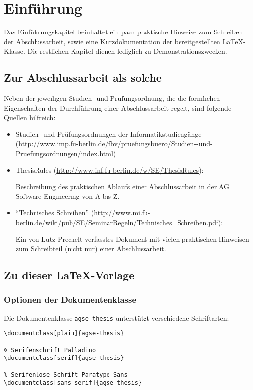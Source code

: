 \section{Einführung}

Das Einführungskapitel beinhaltet ein paar praktische Hinweise zum Schreiben
der Abschlussarbeit, sowie eine Kurzdokumentation der bereitgestellten
\LaTeX-Klasse.
Die restlichen Kapitel dienen lediglich zu Demonstrationszwecken.

\subsection{Zur Abschlussarbeit als solche}

Neben der jeweiligen Studien- und Prüfungsordnung, die die förmlichen
Eigenschaften der Durchführung einer Abschlussarbeit regelt, sind folgende
Quellen hilfreich:
\begin{itemize}
    \item Studien- und Prüfungsordnungen der Informatikstudiengänge
    (\url{http://www.imp.fu-berlin.de/fbv/pruefungsbuero/Studien--und-Pruefungsordnungen/index.html})

    \item ThesisRules (\url{http://www.inf.fu-berlin.de/w/SE/ThesisRules}):

    Beschreibung des praktischen Ablaufs einer Abschlussarbeit in der AG
    Software Engineering von A bis Z.

    \item "`Technisches Schreiben"'
    (\url{http://www.mi.fu-berlin.de/wiki/pub/SE/SeminarRegeln/Technisches_Schreiben.pdf}):

    Ein von Lutz Prechelt verfasstes Dokument mit vielen praktischen
    Hinweisen zum Schreibteil (nicht nur) einer Abschlussarbeit.
\end{itemize}

\subsection{Zu dieser \LaTeX{}-Vorlage}

\subsubsection{Optionen der Dokumentenklasse}

Die Dokumentenklasse \texttt{agse-thesis} unterstützt verschiedene
Schriftarten:
\begin{lstlisting}[language={[LaTeX]TeX}]
% Standard LaTeX Schriftart
\documentclass[plain]{agse-thesis}

% Serifenschrift Palladino
\documentclass[serif]{agse-thesis}

% Serifenlose Schrift Paratype Sans
\documentclass[sans-serif]{agse-thesis}
\end{lstlisting}

